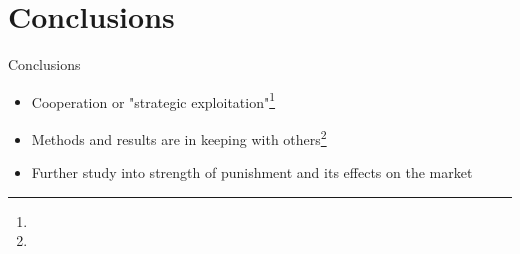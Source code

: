\documentclass{beamer}
\begin{document}
\section{Conclusions}
\begin{frame}{Conclusions}
\begin{itemize}
    \item Cooperation or "strategic exploitation"\footnote{}
    \item Methods and results are in keeping with others\footnote{}
    \item Further study into strength of punishment and its effects on the market
\end{itemize}
\end{frame}
\end{document}
